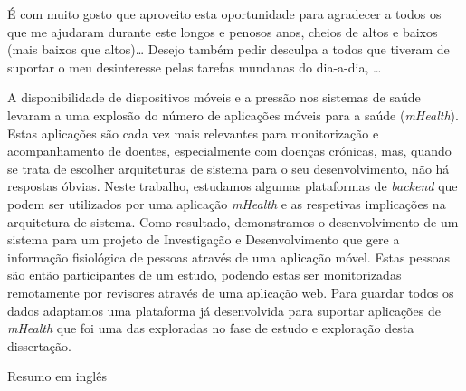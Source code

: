 \documentclass[11pt,twoside,a4paper]{report}
\begin{document}
\TitlePage
  \vspace*{55mm}
       {\'E com muito gosto que aproveito esta oportunidade para agradecer a todos os que me
        ajudaram durante este longos e penosos anos, cheios de altos e baixos (mais baixos que
        altos)\ldots}
  \TEXT{}
       {Desejo tamb\'em pedir desculpa a todos que tiveram de suportar o meu desinteresse pelas
        tarefas mundanas do dia-a-dia, \ldots}
\EndTitlePage
\titlepage\ \endtitlepage %

\TitlePage
  \vspace*{55mm}
       {A disponibilidade de dispositivos móveis e a pressão nos sistemas de saúde levaram a uma explosão do número de aplicações móveis para a saúde (\textit{mHealth}). Estas aplicações são cada vez mais relevantes para monitorização e acompanhamento de doentes, especialmente com doenças crónicas, mas, quando se trata de escolher arquiteturas de sistema para o seu desenvolvimento, não há respostas óbvias. Neste trabalho, estudamos algumas plataformas de \textit{backend} que podem ser utilizados por uma aplicação \textit{mHealth} e as respetivas implicações na arquitetura de sistema. }
    \TEXT{}
       {   
       Como resultado, demonstramos o desenvolvimento de um sistema para um projeto de Investigação e Desenvolvimento que gere a informação fisiológica de pessoas através de uma aplicação móvel. Estas pessoas são então participantes de um estudo, podendo estas ser monitorizadas remotamente por revisores através de uma aplicação web. Para guardar todos os dados adaptamos uma plataforma já desenvolvida para suportar aplicações de \textit{mHealth} que foi uma das exploradas no fase de estudo e exploração desta dissertação.}
\EndTitlePage
\titlepage\ \endtitlepage %

\TitlePage
  \vspace*{55mm}
       { Resumo em inglês }
\EndTitlePage
\titlepage\ \endtitlepage %


%
%


\tableofcontents

\cleardoublepage
\listoffigures

\cleardoublepage
\listoftables

\cleardoublepage


\printglossary[style=mcolindex,title=Lista de Abrevia\c c\~oes e Acr\'onimos, nonumberlist]
\end{document}
